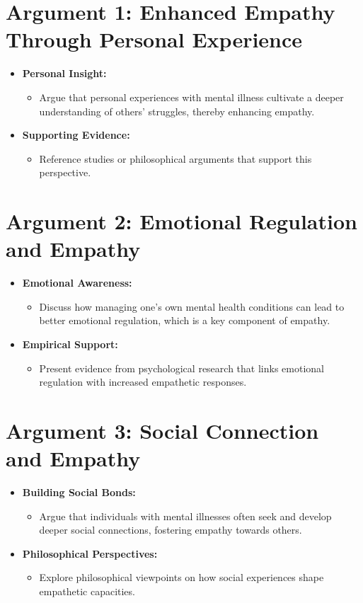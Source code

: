 \documentclass[stu]{apa7}
\begin{document}
\section{Argument 1: Enhanced Empathy Through Personal Experience}
\begin{itemize}
    \item \textbf{Personal Insight:}
        \begin{itemize}
            \item Argue that personal experiences with mental illness cultivate a deeper understanding of others' struggles, thereby enhancing empathy.
        \end{itemize}
    \item \textbf{Supporting Evidence:}
        \begin{itemize}
            \item Reference studies or philosophical arguments that support this perspective.
        \end{itemize}
\end{itemize}

\section{Argument 2: Emotional Regulation and Empathy}
\begin{itemize}
    \item \textbf{Emotional Awareness:}
        \begin{itemize}
            \item Discuss how managing one's own mental health conditions can lead to better emotional regulation, which is a key component of empathy.
        \end{itemize}
    \item \textbf{Empirical Support:}
        \begin{itemize}
            \item Present evidence from psychological research that links emotional regulation with increased empathetic responses.
        \end{itemize}
\end{itemize}

\section{Argument 3: Social Connection and Empathy}
\begin{itemize}
    \item \textbf{Building Social Bonds:}
        \begin{itemize}
            \item Argue that individuals with mental illnesses often seek and develop deeper social connections, fostering empathy towards others.
        \end{itemize}
    \item \textbf{Philosophical Perspectives:}
        \begin{itemize}
            \item Explore philosophical viewpoints on how social experiences shape empathetic capacities.
        \end{itemize}
\end{itemize}
\end{document}
